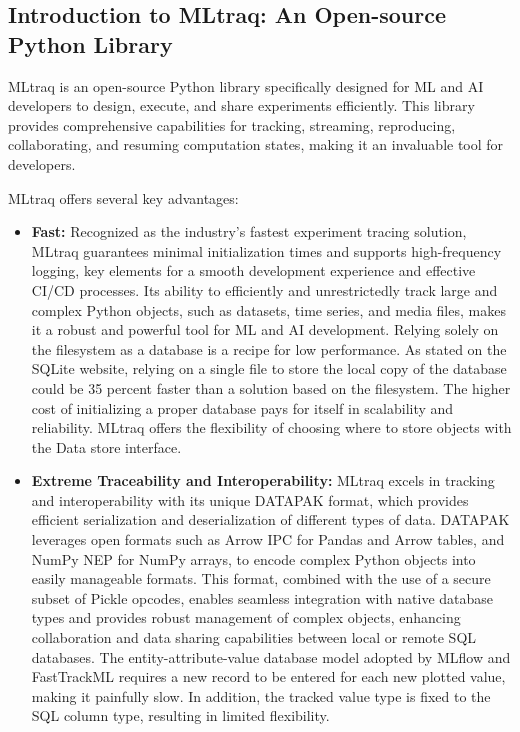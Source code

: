 \subsection{Introduction to MLtraq: An Open-source Python Library}

MLtraq is an open-source Python library specifically designed for ML and AI developers to design, execute, and share experiments efficiently. This library provides comprehensive capabilities for tracking, streaming, reproducing, collaborating, and resuming computation states, making it an invaluable tool for developers. \cite{mltraq2024}

MLtraq offers several key advantages:

\begin{itemize}
    \item \textbf{Fast:} Recognized as the industry's fastest experiment tracing solution, MLtraq guarantees minimal initialization times and supports high-frequency logging, key elements for a smooth development experience and effective CI/CD processes. Its ability to efficiently and unrestrictedly track large and complex Python objects, such as datasets, time series, and media files, makes it a robust and powerful tool for ML and AI development. Relying solely on the filesystem as a database is a recipe for low performance. As stated on the SQLite website, relying on a single file to store the local copy of the database could be 35 percent faster than a solution based on the \cite{sqlite2024} filesystem. The higher cost of initializing a proper database pays for itself in scalability and reliability. MLtraq offers the flexibility of choosing where to store objects with the Data store interface.
    \item \textbf{Extreme Traceability and Interoperability:} MLtraq excels in tracking and interoperability with its unique DATAPAK format, which provides efficient serialization and deserialization of different types of data. DATAPAK leverages open formats such as Arrow IPC for Pandas and Arrow tables, and NumPy NEP for NumPy arrays, to encode complex Python objects into easily manageable formats. This format, combined with the use of a secure subset of Pickle opcodes, enables seamless integration with native database types and provides robust management of complex objects, enhancing collaboration and data sharing capabilities between local or remote SQL databases. The entity-attribute-value database model adopted by MLflow and FastTrackML requires a new record to be entered for each new plotted value, making it painfully slow. In addition, the tracked value type is fixed to the SQL column type, resulting in limited flexibility.

\end{itemize}
